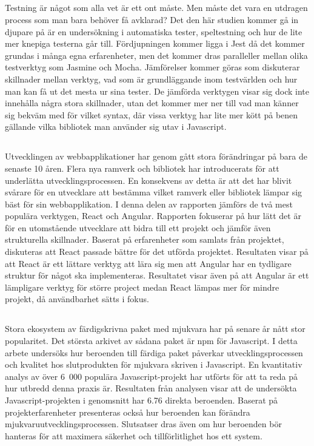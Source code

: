 \subsection*{}
Testning är något som alla vet är ett ont måste. Men måste det vara en utdragen process som man bara behöver få avklarad? Det den här studien kommer gå in djupare på är en undersökning i automatiska tester, speltestning och hur de lite mer knepiga testerna går till. Fördjupningen kommer ligga i Jest då det kommer grundas i många egna erfarenheter, men det kommer dras paralleller mellan olika testverktyg som Jasmine och Mocha. Jämförelser kommer göras som diskuterar skillnader mellan verktyg, vad som är grundläggande inom testvärlden och hur man kan få ut det mesta ur sina tester. De jämförda verktygen visar sig dock inte innehålla några stora skillnader, utan det kommer mer ner till vad man känner sig bekväm med för vilket syntax, där vissa verktyg har lite mer kött på benen gällande vilka bibliotek man använder sig utav i Javascript.

\subsection*{}
Utvecklingen av webbapplikationer har genom gått stora förändringar på bara de senaste 10 åren. Flera nya ramverk och bibliotek har introducerats för att underlätta utvecklingsprocessen. En konsekvens av detta är att det har blivit svårare för en utvecklare att bestämma vilket ramverk eller bibliotek lämpar sig bäst för sin webbapplikation. I denna delen av rapporten jämförs de två mest populära verktygen, React och Angular. Rapporten fokuserar på hur lätt det är för en utomstående utvecklare att bidra till ett projekt och jämför även strukturella skillnader. Baserat på erfarenheter som samlats från projektet, diskuteras att React passade bättre för det utförda projektet. Resultaten visar på att React är ett lättare verktyg att lära sig men att Angular har en tydligare struktur för något ska implementeras. Resultatet visar även på att Angular är ett lämpligare verktyg för större project medan React lämpas mer för mindre projekt, då användbarhet sätts i fokus.

\subsection*{}
Stora ekosystem av färdigskrivna paket med mjukvara har på senare år nått stor popularitet. Det största arkivet av sådana paket är npm för Javascript. I detta arbete undersöks hur beroenden till färdiga paket påverkar utvecklingsprocessen och kvalitet hos slutprodukten för mjukvara skriven i Javascript. En kvantitativ analys av över 6~000 populära Javascript-projekt har utförts för att ta reda på hur utbredd denna praxis är. Resultaten från analysen visar att de undersökta Javascript-projekten i genomsnitt har 6.76 direkta beroenden. Baserat på projekterfarenheter presenteras också hur beroenden kan förändra mjukvaruutvecklingsprocessen. Slutsatser dras även om hur beroenden bör hanteras för att maximera säkerhet och tillförlitlighet hos ett system.

